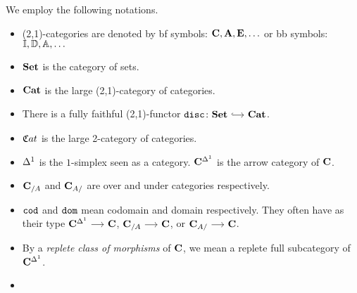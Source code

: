 \documentclass[a4paper,dvipsnames, 11pt]{amsart}
\begin{document}
\maketitle
\cite{Cis19}
\begin{notation}
	We employ the following notations.
	\begin{itemize}
		\item %
			(2,1)-categories are denoted by bf symbols:
			$\mathbf{C},\mathbf{A},\mathbf{E},\ldots$
			or bb symbols:
			$\mathbb{I},\mathbb{D},\mathbb{A},\ldots$
		\item %
			$\mathbf{Set}$ is the category of sets.
		\item %
			${\mathbf{Cat}}$ is the large (2,1)-category of categories.
		\item %
			There is a fully faithful (2,1)-functor $\disc\colon\Set\arr[hook]\Cat$.
		\item %
			${{\mathfrak{C}}{at}}$ is the large 2-category of categories.
		\item %
			${\Delta^1}$ is the $1$-simplex seen as a category.
			$\mathbf{C}^{\Delta^1}$ is the arrow category of $\mathbf{C}$.
		\item %
			$\mathbf{C}_{/A}$ and $\mathbf{C}_{A/}$ are over and under categories respectively.
		\item %
			$\mathtt{cod}$ and $\mathtt{dom}$ mean codomain and domain respectively. They often have as their type
			$\C^\ra\arr\C$, $\C_{/A}\arr\C$,
			or $\C_{A/}\arr\C$.
		\item %
			By a \emph{replete class of morphisms} of $\mathbf{C}$, we mean a replete full subcategory of $\mathbf{C}^{\Delta^1}$.
		\item %
		\qedhere %
	\end{itemize}
\end{notation}
\end{document}
